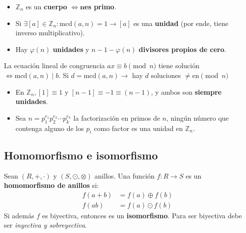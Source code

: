 \documentclass[12pt]{article}
\begin{document}
\bigskip

\begin{tcolorbox}[title=Propiedades del anillo \( \mathbb{Z}_n \)]
\begin{itemize}
    \item \( \mathbb{Z}_n \) es un \textbf{cuerpo} \( \boldsymbol{\Leftrightarrow n} \)\textbf{es primo}.
    \item Si \( \exists [a] \in \mathbb{Z}_n : \text{mcd}(a, n) = 1 \rightarrow [a] \) es una \textbf{unidad} (por ende, tiene inverso multiplicativo).
    \item Hay \( \varphi(n) \) \textbf{unidades} y \( n - 1 - \varphi(n) \) \textbf{divisores propios de cero}.
\end{itemize}
\end{tcolorbox}

\begin{tcolorbox}[title=Ecuación lineal de congruencia]
La ecuación lineal de congruencia \( ax \equiv b \pmod{n} \) tiene solución \( \Leftrightarrow \text{mcd}(a, n) \mid b \).
Si \( d = \text{mcd}(a, n) \rightarrow\) hay \( d \) soluciones \( \neq \text{en} \pmod{n} \)
\end{tcolorbox}

\begin{tcolorbox}[title=Notas]
\begin{itemize}
    \item En \( \mathbb{Z}_n, [1] \equiv 1 \) y \( [n - 1] \equiv -1 \equiv (n - 1) \), y ambos son \textbf{siempre unidades}. 
    \item Sea \( n = p_1^{e_1} p_2^{e_2} \cdots p_k^{e_k} \) la factorización en primos de \( n \), ningún número que contenga alguno de los \( p_i \) como factor es una unidad en \( \mathbb{Z}_n \).
\end{itemize}
\end{tcolorbox}

\newpage

\subsection*{Homomorfismo e isomorfismo}

\begin{tcolorbox}[title=Definición]
Sean \( (R, +, \cdot) \) y \( (S, \odot, \otimes) \) anillos. Una función \( f: R \to S \) es un \textbf{homomorfismo de anillos} si:
\begin{align*}
    f(a + b) &= f(a) \oplus f(b) \\
    f(a b) &= f(a) \odot f(b)
\end{align*}
Si además \( f \) es biyectiva, entonces es un \textbf{isomorfismo}.
Para ser biyectiva debe ser \textit{inyectiva y sobreyectiva}.
\end{tcolorbox}
\end{document}
